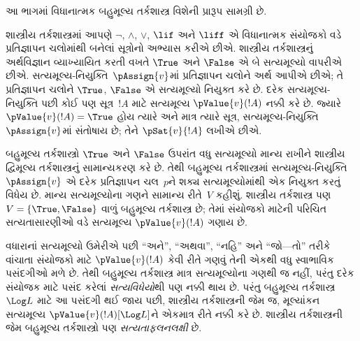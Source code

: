 
\label{guunit:OLP-0383}


\begin{editorial}
  આ ભાગમાં વિધાનાત્મક બહુમૂલ્ય તર્કશાસ્ત્ર વિશેની
  પ્રારૂપ સામગ્રી છે.
\end{editorial}

\begingroup
\makeatletter{}\makeatother

\label{guunit:OLP-0384}


\begingroup
\makeatletter{}\makeatother


\label{guunit:OLP-0385}


શાસ્ત્રીય તર્કશાસ્ત્રમાં આપણે $\lnot$, $\land$, $\lor$,
$\lif$ અને $\liff$ એ વિધાનાત્મક સંયોજકો વડે
પ્રતિજ્ઞાપન ચલોમાંથી બનેલાં સૂત્રોનો
અભ્યાસ કરીએ છીએ. શાસ્ત્રીય તર્કશાસ્ત્રનું અર્થવિજ્ઞાન
વ્યાખ્યાયિત કરતી વખતે $\True$ અને $\False$ એ બે
સત્યમૂલ્યો વાપરીએ છીએ. સત્યમૂલ્ય-નિયુક્તિ~$\pAssign{v}$માં
પ્રતિજ્ઞાપન ચલોને અર્થ આપીએ છીએ; તે
પ્રતિજ્ઞાપન ચલોને $\True$, $\False$ એ
સત્યમૂલ્યો નિયુક્ત કરે છે. દરેક સત્યમૂલ્ય-નિયુક્તિ પછી
કોઈ પણ સૂત્ર~$!A$ માટે સત્યમૂલ્ય
$\pValue{v}(!A)$ નક્કી કરે છે. જ્યારે
$\pValue{v}(!A) = \True$ હોય ત્યારે અને માત્ર
ત્યારે સૂત્ર, સત્યમૂલ્ય-નિયુક્તિ~$\pAssign{v}$માં
સંતોષાય છે; તેને $\pSat{v}{!A}$ લખીએ છીએ.

બહુમૂલ્ય તર્કશાસ્ત્રો $\True$ અને $\False$ ઉપરાંત
વધુ સત્યમૂલ્યો માન્ય રાખીને શાસ્ત્રીય દ્વિમૂલ્ય
તર્કશાસ્ત્રનું સામાન્યકરણ કરે છે. તેથી બહુમૂલ્ય
તર્કશાસ્ત્રમાં સત્યમૂલ્ય-નિયુક્તિ~$\pAssign{v}$ એ
દરેક પ્રતિજ્ઞાપન ચલ~$p$ને શક્ય
સત્યમૂલ્યોમાંથી એક નિયુક્ત કરતું વિધેય છે. માન્ય
સત્યમૂલ્યોના ગણને સામાન્ય રીતે~$V$ કહીશું.
શાસ્ત્રીય તર્કશાસ્ત્ર પણ $V = \{\True, \False\}$
વાળું બહુમૂલ્ય તર્કશાસ્ત્ર છે; તેમાં સંયોજકો માટેની
પરિચિત સત્યતાસારણીઓ વડે સત્યમૂલ્ય
$\pValue{v}(!A)$ ગણાય છે.

વધારાનાં સત્યમૂલ્યો ઉમેરીએ પછી ``અને'', ``અથવા'',
``નહિ'' અને ``જો---તો'' તરીકે વાંચાતા સંયોજકો માટે
$\pValue{v}(!A)$ કેવી રીતે ગણવું તેની એકથી વધુ
સ્વાભાવિક પસંદગીઓ મળે છે. તેથી બહુમૂલ્ય તર્કશાસ્ત્ર
માત્ર સત્યમૂલ્યોના ગણથી જ નહીં, પરંતુ દરેક
સંયોજક માટે પસંદ કરેલાં \emph{સત્યવિધેયો}થી પણ
નક્કી થાય છે. પરંતુ બહુમૂલ્ય તર્કશાસ્ત્ર~$\Log L$
માટે આ પસંદગી થઈ જાય પછી, શાસ્ત્રીય તર્કશાસ્ત્રની
જેમ જ, મૂલ્યાંકન સત્યમૂલ્ય
$\pValue{v}(!A)[\Log L]$ને એકમાત્ર રીતે નક્કી કરે
છે. શાસ્ત્રીય તર્કશાસ્ત્રની જેમ બહુમૂલ્ય તર્કશાસ્ત્રો
પણ \emph{સત્યતાફલનલક્ષી} છે.

